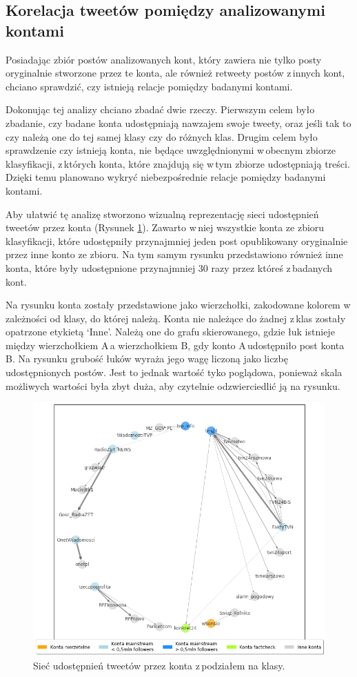 \subsection{Korelacja tweetów pomiędzy analizowanymi kontami}
Posiadając zbiór postów analizowanych kont, który zawiera nie tylko posty oryginalnie stworzone przez te konta, ale również retweety postów z\,innych kont, chciano sprawdzić, czy istnieją relacje pomiędzy badanymi kontami. 
\par
Dokonując tej analizy chciano zbadać dwie rzeczy. Pierwszym celem było zbadanie, czy badane konta udostępniają nawzajem swoje tweety, oraz jeśli tak to czy należą one do tej samej klasy czy do różnych klas. Drugim celem było sprawdzenie czy istnieją konta, nie będące uwzględnionymi w\,obecnym zbiorze klasyfikacji, z\,których konta, które znajdują się w\,tym zbiorze udostępniają treści. Dzięki temu planowano wykryć niebezpośrednie relacje pomiędzy badanymi kontami.
\par
Aby ułatwić tę analizę stworzono wizualną reprezentację sieci udostępnień tweetów przez konta (Rysunek \ref{fig:connectedaccounts}). Zawarto w\,niej wszystkie konta ze zbioru klasyfikacji, które udostępniły przynajmniej jeden post opublikowany oryginalnie przez inne konto ze zbioru. Na tym samym rysunku przedstawiono również inne konta, które były udostępnione przynajmniej 30 razy przez któreś z\,badanych kont. 
\par
Na rysunku konta zostały przedstawione jako wierzchołki, zakodowane kolorem w\,zależności od klasy, do której należą. Konta nie należące do żadnej z\,klas zostały opatrzone etykietą ‘Inne’. Należą one do grafu skierowanego, gdzie łuk istnieje między wierzchołkiem A\,a wierzchołkiem B, gdy konto A\,udostępniło post konta B. Na rysunku grubość łuków wyraża jego wagę liczoną jako liczbę udostępnionych postów. Jest to jednak wartość tyko poglądowa, ponieważ skala możliwych wartości była zbyt duża, aby czytelnie odzwierciedlić ją na rysunku. 
\begin{figure}[!h]
	\centering \includegraphics[width=1.0\linewidth]{img/results/connectionbetweenaccounts.png}
	\caption{Sieć udostępnień tweetów przez konta z\,podziałem na  klasy.} \label{fig:connectedaccounts}
\end{figure}
